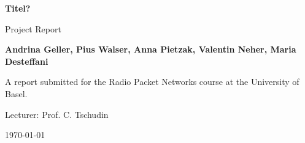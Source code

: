 \begin{titlepage}

    \begin{center}
        \vspace*{1cm}

        \Huge
        \textbf{Titel?}
        
        \vspace{0.5cm}
        
        \LARGE
        Project Report
        
        \vspace{1.5cm}
        
        \textbf{Andrina Geller, Pius Walser, Anna Pietzak, Valentin Neher, Maria Desteffani}

        \vspace{1.5cm}
        
        \vfill

        \Large
        A report submitted for the Radio Packet Networks course at the University of Basel.

        Lecturer: Prof. C. Tschudin

        \vspace{0.5cm}
        
        \today
        
    \end{center}
    
\end{titlepage}